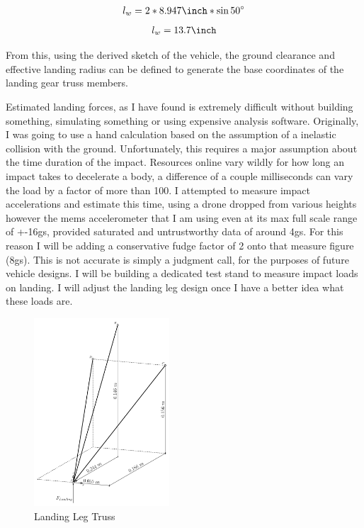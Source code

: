 \documentclass[12pt,letterpaper]{article}
\begin{document}
\begin{gather*}
    \centering
    l_w = 2 * 8.947\unit{\inch} * \sin{50^\circ}
\end{gather*}
\begin{gather*}
    \centering
    l_w = 13.7\unit{\inch}
\end{gather*}

From this, using the derived sketch of the vehicle, the ground clearance and effective landing radius can be defined to generate the base coordinates of the landing gear truss members.

Estimated landing forces, as I have found is extremely difficult without building something, simulating something or using expensive analysis software. Originally, I was going to use a hand calculation based on the assumption of a inelastic collision with the ground. Unfortunately, this requires a major assumption about the time duration of the impact. Resources online vary wildly for how long an impact takes to decelerate a body, a difference of a couple milliseconds can vary the load by a factor of more than 100. I attempted to measure impact accelerations and estimate this time, using a drone dropped from various heights however the mems accelerometer that I am using even at its max full scale range of +-16gs, provided saturated and untrustworthy data of around 4gs. For this reason I will be adding a conservative fudge factor of 2 onto that measure figure (8gs). This is not accurate is simply a judgment call, for the purposes of future vehicle designs. I will be building a dedicated test stand to measure impact loads on landing. I will adjust the landing leg design once I have a better idea what these loads are. 


\pagebreak

\begin{figure}[h!]
\centering
\includegraphics[width = 0.45\textwidth]{Landing_Legs_Fig/Landing_Leg_Truss.pdf}
\caption{Landing Leg Truss}
\end{figure}
\end{document}
